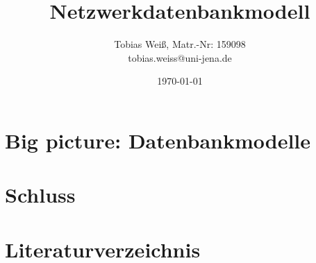 \documentclass[11pt,a4paper,paper=a4,oneside,parskip=half+,pdftex]{scrarticle}
\begin{document}
\titlehead{MW31.6 - Data and Knowledge Management}
\subject{Handout}
\title{Netzwerkdatenbankmodell}
\author{Tobias Weiß, Matr.-Nr: 159098\\tobias.weiss@uni-jena.de}
\date{\today}
\maketitle
\tableofcontents

\section{Big picture: Datenbankmodelle}
\lipsum

\section{}
\lipsum

\section{Schluss}
\lipsum

\section{Literaturverzeichnis}


\end{document}

